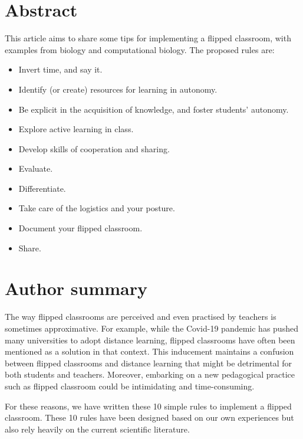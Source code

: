 \documentclass[10pt,letterpaper]{article}
\begin{document}
\section*{Abstract}

This article aims to share some tips for implementing a flipped classroom, with examples from biology and computational biology. 
The proposed rules are:

\begin{itemize}
\item Invert time, and say it.
\item Identify (or create) resources for learning in autonomy.
\item Be explicit in the acquisition of knowledge, and foster students' autonomy.
\item Explore active learning in class.
\item Develop skills of cooperation and sharing.
\item Evaluate.
\item Differentiate.
\item Take care of the logistics and your posture.
\item Document your flipped classroom.
\item Share.
\end{itemize}


\section*{Author summary}
The way flipped classrooms are perceived and even practised by teachers is sometimes approximative. For example, while the Covid-19 pandemic has pushed many universities to adopt distance learning, flipped classrooms have often been mentioned as a solution in that context. This inducement maintains a confusion between flipped classrooms and distance learning that might be detrimental for both students and teachers. Moreover, embarking on a new pedagogical practice such as flipped classroom could be intimidating and time-consuming.

For these reasons, we have written these 10 simple rules to implement a flipped classroom. These 10 rules have been designed based on our own experiences but also rely heavily on the current scientific literature.


\linenumbers
\end{document}
